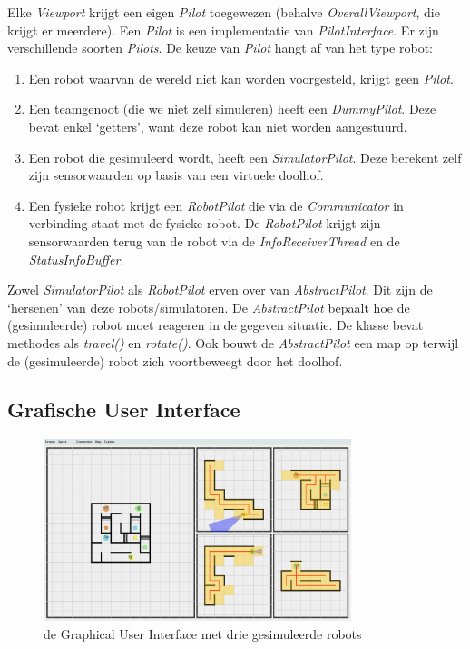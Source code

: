 \documentclass[tt3]{penoverslag}
\begin{document}
Elke \textit{Viewport} krijgt een eigen \textit{Pilot} toegewezen (behalve \textit{OverallViewport}, die krijgt er meerdere). Een \textit{Pilot} is een implementatie van \textit{PilotInterface}. Er zijn verschillende soorten \textit{Pilots}. De keuze van \textit{Pilot} hangt af van het type robot:

\begin{enumerate}
	\item Een robot waarvan de wereld niet kan worden voorgesteld, krijgt geen \textit{Pilot}.
	\item Een teamgenoot (die we niet zelf simuleren) heeft een \textit{DummyPilot}. Deze bevat enkel `getters', want deze robot kan niet worden aangestuurd.
	\item Een robot die gesimuleerd wordt, heeft een \textit{SimulatorPilot}. Deze berekent zelf zijn sensorwaarden op basis van een virtuele doolhof.
	\item Een fysieke robot krijgt een \textit{RobotPilot} die via de \textit{Communicator} in verbinding staat met de fysieke robot. De \textit{RobotPilot} krijgt zijn sensorwaarden terug van de robot via de \textit{InfoReceiverThread} en de \textit{StatusInfoBuffer}.
\end{enumerate}

 Zowel \textit{SimulatorPilot} als \textit{RobotPilot} erven over van \textit{AbstractPilot}. Dit zijn de `hersenen' van deze robots/simulatoren. De \textit{AbstractPilot} bepaalt hoe de (gesimuleerde) robot moet reageren in de gegeven situatie. De klasse bevat methodes als \textit{travel()} en \textit{rotate()}. Ook bouwt de \textit{AbstractPilot} een map op terwijl de (gesimuleerde) robot zich voortbeweegt door het doolhof.

\subsection{Grafische User Interface}
\label{ssec:GUI}

\begin{figure}[h]
\centering
	\includegraphics[width=0.8\textwidth]{GUI1}
\caption{de Graphical User Interface met drie gesimuleerde robots}
\label{fig:GUI1}
\end{figure}
\end{document}
